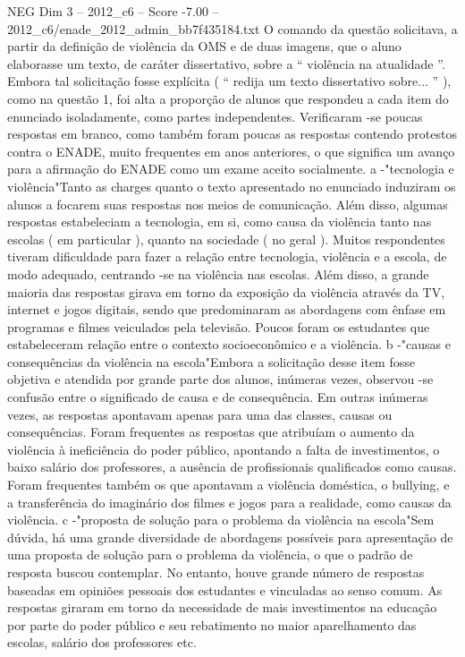 \begin{textsample}{NEG Dim 3 – 2012\_c6 – Score -7.00 – 2012\_c6/enade\_2012\_admin\_bb7f435184.txt}
O comando da questão solicitava, a partir da definição de violência da OMS e de duas imagens, que o aluno elaborasse um texto, de caráter dissertativo, sobre a “ violência na atualidade ”.
Embora tal solicitação fosse explícita ( “ redija um texto dissertativo sobre... ” ), como na questão 1, foi alta a proporção de alunos que respondeu a cada item do enunciado isoladamente, como partes independentes.
Verificaram -se poucas respostas em branco, como também foram poucas as respostas contendo protestos contra o ENADE, muito frequentes em anos anteriores, o que significa um avanço para a afirmação do ENADE como um exame aceito socialmente. a -"tecnologia e violência"Tanto as charges quanto o texto apresentado no enunciado induziram os alunos a focarem suas respostas nos meios de comunicação.
Além disso, algumas respostas estabeleciam a tecnologia, em si, como causa da violência tanto nas escolas ( em particular ), quanto na sociedade ( no geral ).
Muitos respondentes tiveram dificuldade para fazer a relação entre tecnologia, violência e a escola, de modo adequado, centrando -se na violência nas escolas.
Além disso, a grande maioria das respostas girava em torno da exposição da violência através da TV, internet e jogos digitais, sendo que predominaram as abordagens com ênfase em programas e filmes veiculados pela televisão.
Poucos foram os estudantes que estabeleceram relação entre o contexto socioeconômico e a violência. b -"causas e consequências da violência na escola"Embora a solicitação desse item fosse objetiva e atendida por grande parte dos alunos, inúmeras vezes, observou -se confusão entre o significado de causa e de consequência.
Em outras inúmeras vezes, as respostas apontavam apenas para uma das classes, causas ou consequências.
Foram frequentes as respostas que atribuíam o aumento da violência à ineficiência do poder público, apontando a falta de investimentos, o baixo salário dos professores, a ausência de profissionais qualificados como causas.
Foram frequentes também os que apontavam a violência doméstica, o bullying, e a transferência do imaginário dos filmes e jogos para a realidade, como causas da violência. c -"proposta de solução para o problema da violência na escola"Sem dúvida, há uma grande diversidade de abordagens possíveis para apresentação de uma proposta de solução para o problema da violência, o que o padrão de resposta buscou contemplar.
No entanto, houve grande número de respostas baseadas em opiniões pessoais dos estudantes e vinculadas ao senso comum.
As respostas giraram em torno da necessidade de mais investimentos na educação por parte do poder público e seu rebatimento no maior aparelhamento das escolas, salário dos professores etc.

\end{textsample}
